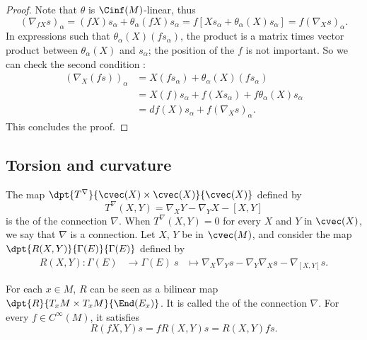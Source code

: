 \begin{proof}
Note that $\theta$ is $\Cinf(M)$-linear, thus
\begin{equation}
  (\nabla_{fX}s)_{\alpha}=(fX)s_{\alpha}+\theta_{\alpha}(fX)s_{\alpha}
                        =f[ Xs_{\alpha}+\theta_{\alpha}(X)s_{\alpha} ]
			=f(\nabla_Xs)_{\alpha}.
\end{equation}
In expressions such that $\theta_{\alpha}(X)(fs_{\alpha})$, the product is a matrix times vector product between $\theta_{\alpha}(X)$ and $s_{\alpha}$; the position of the $f$ is not important. So we can check the second condition :
\begin{equation}
\begin{split}
(\nabla_X(fs))_{\alpha}&=X(fs_{\alpha})+\theta_{\alpha}(X)(fs_{\alpha}) \\
                     &=X(f)s_{\alpha}+f(Xs_{\alpha})+f\theta_{\alpha}(X)s_{\alpha}\\
		     &=df(X)s_{\alpha}+f(\nabla_Xs)_{\alpha}.
\end{split}
\end{equation}
This concludes the proof.
\end{proof}


\subsection{Torsion and curvature}

The map $\dpt{T^{\nabla}}{\cvec(X)\times\cvec(X)}{\cvec(X)}$ defined by
\begin{equation}
     T^{\nabla}(X,Y)=\nabla_XY-\nabla_YX-[X,Y]\label{deftorsion}
\end{equation}
is the  of the connection $\nabla$. When $T^{\nabla}(X,Y)=0$ for every $X$ and $Y$ in $\cvec(X)$, we say that $\nabla$ is a  connection. Let $X$, $Y$ be in $\cvec(M)$, and consider the map $\dpt{R(X,Y)}{\Gamma(E)}{\Gamma(E)}$ defined by
		\begin{equation}
		\begin{aligned}
			R(X,Y) \colon \Gamma(E) &\to \Gamma(E)\
			s&\mapsto \nabla_X\nabla_Ys-\nabla_Y\nabla_Xs-\nabla_{[X,Y]}s.
		\end{aligned}
	\end{equation}	

For each $x\in M$, $R$ can be seen as a bilinear map $\dpt{R}{T_xM\times T_xM}{\End(E_x)}$. It is called the  of the connection $\nabla$. For every $f\in C^{\infty}(M)$, it satisfies
\[
 R(fX,Y)s=fR(X,Y)s=R(X,Y)fs.
\]
    


